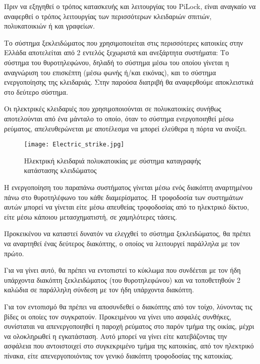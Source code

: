 \label{ch:unlock_mechanism}
Πριν να εξηγηθεί ο τρόπος κατασκευής και λειτουργίας του PiLock, είναι αναγκαίο να αναφερθεί ο τρόπος λειτουργίας των περισσότερων κλειδαριών σπιτιών, πολυκατοικιών ή και γραφείων.

Το σύστημα ξεκλειδώματος που χρησιμοποιείται στις περισσότερες κατοικίες στην Ελλάδα αποτελείται από 2 εντελός ξεχωριστά και ανεξάρτητα συστήματα: Το σύστημα του θυροτηλεφώνου, δηλαδή το σύστημα μέσω του οποίου γίνεται η αναγνώριση του επισκέπτη (μέσω φωνής ή/και εικόνας), και το σύστημα ενεργοποίησης της κλειδαριάς. Στην παρούσα διατριβή θα αναφερθούμε αποκλειστικά στο δεύτερο σύστημα.

Οι ηλεκτρικές κλειδαριές που χρησιμοποιούνται σε πολυκατοικίες συνήθως αποτελούνται από ένα μάνταλο το οποίο, όταν το σύστημα ενεργοποιηθεί μέσω ρεύματος, απελευθερώνεται με αποτέλεσμα να μπορεί ελεύθερα η πόρτα να ανοίξει.

\begin{figure}[h]
	\centering
		\texttt{[image: Electric\_strike.jpg]}
	\caption{Ηλεκτρική κλειδαριά πολυκατοικίας με σύστημα καταγραφής κατάστασης κλειδώματος}
\end{figure}

Η ενεργοποίηση του παραπάνω συστήματος γίνεται μέσω ενός διακόπτη αναρτημένου πάνω στο θυροτηλέφωνο του κάθε διαμερίσματος. Η τροφοδοσία των συστημάτων αυτών μπορεί να γίνεται είτε μέσω απευθείας τροφοδοσίας από το ηλεκτρικό δίκτυο, είτε μέσω κάποιου μετασχηματιστή, σε χαμηλότερες τάσεις.

Προκεικένου να καταστεί δυνατόν να ελεγχθεί το σύστημα ξεκλειδώματος, θα πρέπει να αναρτηθεί ένας δεύτερος διακόπτης, ο οποίος να λειτουργεί παράλληλα με τον πρώτο.  %

Για να γίνει αυτό, θα πρέπει να εντοπιστεί το κύκλωμα που συνδέεται με τον ήδη υπάρχοντα διακόπτη ξεκλειδώματος (του θυροτηλεφώνου) και να τοποθετηθούν 2 καλώδια σε παράλληλη σύνδεση με τον ήδη υπάρχοντα διακόπτη.

Για τον εντοπισμό θα πρέπει να αποσυνδεθεί ο διακόπτης από τον τοίχο, λύνοντας τις βίδες οι οποίες τον συγκρατούν. Προκειμένου να γίνει υπο ασφαλές συνθήκες, συνίσταται να απενεργοποιηθεί η παροχή ρεύματος στο παρόν τμήμα της οικίας, μέχρι να ολοκληρωθεί η εγκατάσταση. Αυτό μπορεί να γίνει είτε κατεβάζοντας την ασφάλεια που αντοιστοιχεί στο συγκεκριμένο τμήμα της κατοικίας, από τον ηλεκτρικό πίνακα, είτε απενεργοποιόντας τον γενικό διακόπτη τροφοδοσίας της κατοικίας.

